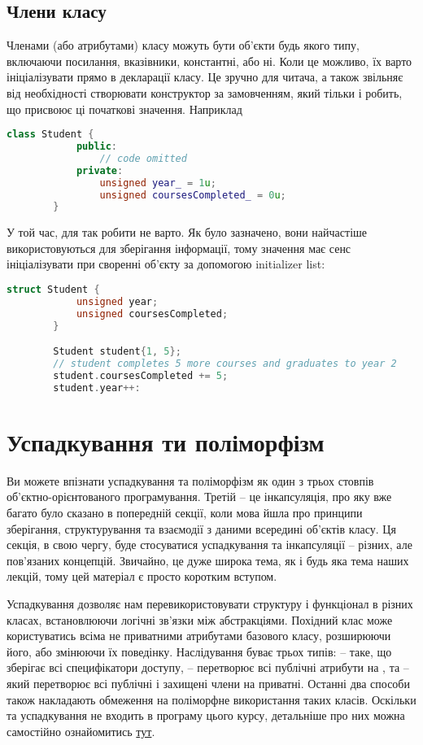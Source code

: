 \documentclass[12pt]{article}
\begin{document}
	\subsection{Члени класу}
	Членами (або атрибутами) класу можуть бути об'єкти будь якого типу, включаючи посилання, вказівники, константні, або ні. Коли це можливо, їх варто ініціалізувати прямо в декларації класу. Це зручно для читача, а також звільняє від необхідності створювати конструктор за замовченням, який тільки і робить, що присвоює ці початкові значення. Наприклад
	\begin{lstlisting}[language=c++]
		class Student {
			public:
				// code omitted
			private:
				unsigned year_ = 1u;
				unsigned coursesCompleted_ = 0u;
		}
	\end{lstlisting}
	У той час, для  так робити не варто. Як було зазначено, вони найчастіше використовуються для зберігання інформації, тому значення має сенс ініціалізувати при своренні об'єкту за допомогою initializer list:
	\begin{lstlisting}[language=c++]
		struct Student {
			unsigned year;
			unsigned coursesCompleted;
		}

		Student student{1, 5};
		// student completes 5 more courses and graduates to year 2
		student.coursesCompleted += 5;
		student.year++:
	\end{lstlisting}

	\section{Успадкування ти поліморфізм}
	Ви можете впізнати успадкування та поліморфізм як один з трьох стовпів об'єктно-орієнтованого програмування. Третій -- це інкапсуляція, про яку вже багато було сказано в попередній секції, коли мова йшла про принципи зберігання, структурування та взаємодії з даними всередині об'єктів класу. Ця секція, в свою чергу, буде стосуватися успадкування та інкапсуляції -- різних, але пов'язаних концепцій. Звичайно, це дуже широка тема, як і будь яка тема наших лекцій, тому цей матеріал є просто коротким вступом.

	Успадкування дозволяє нам перевикористовувати структуру і функціонал в різних класах, встановлюючи логічні зв'язки між абстракціями. Похідний клас може користуватись всіма не приватними атрибутами базового класу, розширюючи його, або змінюючи їх поведінку. Наслідування буває трьох типів:  -- таке, що зберігає всі специфікатори доступу,  -- перетворює всі публічні атрибути на , та  -- який перетворює всі публічні і захищені члени на приватні. Останні два способи також накладають обмеження на поліморфне використання таких класів. Оскільки  та  успадкування не входить в програму цього курсу, детальніше про них можна самостійно ознайомитись \href{https://en.cppreference.com/w/cpp/language/derived_class}{тут}.
\end{document}
